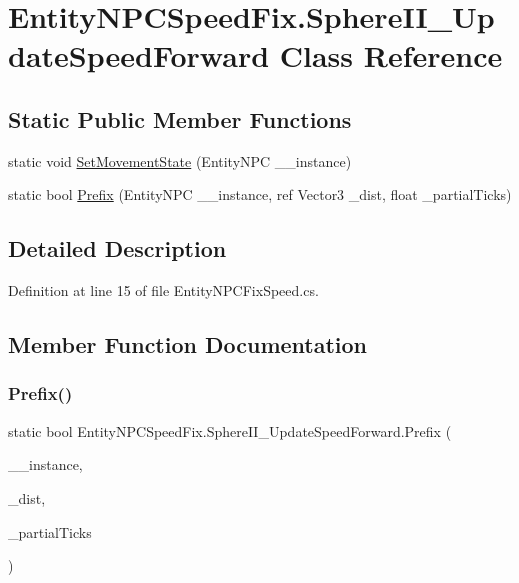 \hypertarget{class_entity_n_p_c_speed_fix_1_1_sphere_i_i___update_speed_forward}{}\section{Entity\+N\+P\+C\+Speed\+Fix.\+Sphere\+I\+I\+\_\+\+Update\+Speed\+Forward Class Reference}
\label{class_entity_n_p_c_speed_fix_1_1_sphere_i_i___update_speed_forward}
\subsection*{Static Public Member Functions}
\begin{DoxyCompactItemize}
\item 
static void \mbox{\hyperlink{class_entity_n_p_c_speed_fix_1_1_sphere_i_i___update_speed_forward_a91173b62ec69b6d116c9cf3b7a1e52ed}{Set\+Movement\+State}} (Entity\+N\+PC \+\_\+\+\_\+instance)
\item 
static bool \mbox{\hyperlink{class_entity_n_p_c_speed_fix_1_1_sphere_i_i___update_speed_forward_ab0ef83ab5083b9e53b7714d16abbd9e6}{Prefix}} (Entity\+N\+PC \+\_\+\+\_\+instance, ref Vector3 \+\_\+dist, float \+\_\+partial\+Ticks)
\end{DoxyCompactItemize}


\subsection{Detailed Description}


Definition at line 15 of file Entity\+N\+P\+C\+Fix\+Speed.\+cs.



\subsection{Member Function Documentation}
\mbox{\label{class_entity_n_p_c_speed_fix_1_1_sphere_i_i___update_speed_forward_ab0ef83ab5083b9e53b7714d16abbd9e6}} 
\subsubsection{\texorpdfstring{Prefix()}{Prefix()}}
{\footnotesize\ttfamily static bool Entity\+N\+P\+C\+Speed\+Fix.\+Sphere\+I\+I\+\_\+\+Update\+Speed\+Forward.\+Prefix (\begin{DoxyParamCaption}\item[{Entity\+N\+PC}]{\+\_\+\+\_\+instance,  }\item[{ref Vector3}]{\+\_\+dist,  }\item[{float}]{\+\_\+partial\+Ticks }\end{DoxyParamCaption})\hspace{0.3cm}{\ttfamily [static]}}



